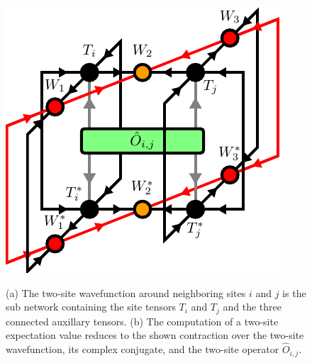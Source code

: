\begin{figure}
	\centering
	\subcaptionbox{\label{fig:disoTPS_twosite_expectation_value_environment}}
	{%
		\usebox{\largestimage}
	}
	\quad\quad
	\subcaptionbox{\label{fig:disoTPS_twosite_expectation_value_computation}}
	{%
		\raisebox{\dimexpr.5\ht\largestimage-.5\height}
		{%
			\includegraphics[scale=1.0]{figures/tikz/disoTPS/two_site_expectation_value/two_site_expectation_value_b.pdf}
		}
	}
	\caption{(a) The two-site wavefunction around neighboring sites $i$ and $j$ is the sub network containing the site tensors $T_i$ and $T_j$ and the three connected auxillary tensors. (b) The computation of a two-site expectation value reduces to the shown contraction over the two-site wavefunction, its complex conjugate, and the two-site operator $\hat{O}_{i,j}$.}
	\label{fig:disoTPS_twosite_expectation_value}
\end{figure}
